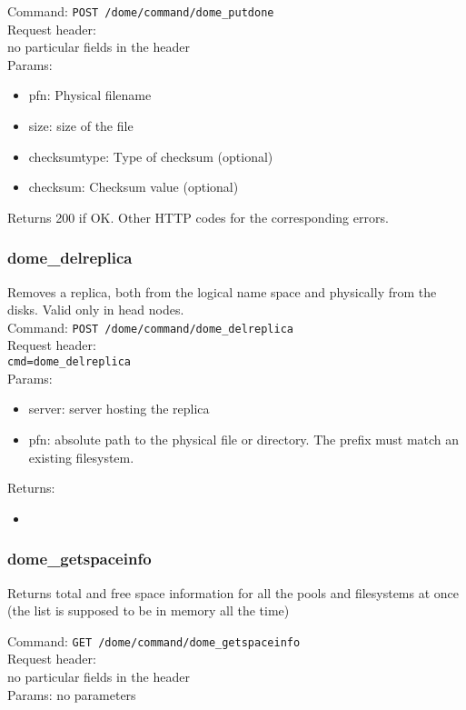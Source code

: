 \documentclass[a4paper,10pt]{scrreprt}
\begin{document}
Command:
\lstinline"POST /dome/command/dome_putdone"\\
Request header:\\
 no particular fields in the header\\

Params:
\begin{itemize}
 \item pfn: Physical filename
 \item size: size of the file
 \item checksumtype: Type of checksum (optional)
 \item checksum: Checksum value (optional)
\end{itemize}

Returns 200 if OK. Other HTTP codes for the corresponding errors.\\


\subsubsection{dome\_delreplica}

Removes a replica, both from the logical name space and physically from the disks. Valid only in head nodes.\\
Command:
\lstinline"POST /dome/command/dome_delreplica"\\

Request header:\\
\lstinline"cmd=dome_delreplica"\\

Params:
\begin{itemize}
 \item server: server hosting the replica
 \item pfn: absolute path to the physical file or directory. The prefix must match an existing filesystem.
\end{itemize}

Returns:
\begin{itemize}
 \item
\end{itemize}



\subsubsection{dome\_getspaceinfo}
Returns total and free space information for all the pools and filesystems at once (the list is supposed to be in memory all the time)

Command:
\lstinline"GET /dome/command/dome_getspaceinfo"\\
Request header:\\
 no particular fields in the header\\
Params:
 no parameters
\end{document}
